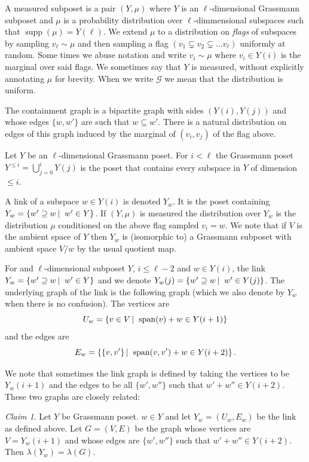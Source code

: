 \documentclass[10pt,a4paper]{article}
\theoremstyle{definition}
\theoremstyle{remark}
\newtheorem{claim}[theorem]{Claim}
\newcommand\sett[2]{\left\{ #1 \left| \; \vphantom{#1 #2} \right. #2  \right\}}
\newcommand{\set}[1]{\{#1\}}
\def\sp{\mathrm{ span}}
\DeclareMathOperator{\supp}{supp}
\renewcommand{\leq}{\leqslant}
\numberwithin{equation}{section}
\def\Gr{\mathcal{G}}
\def\Y{Y}
\begin{document}
A measured subposet is a pair \((\Y,\mu)\) where \(\Y\) is an \(\ell\)-dimensional Grassmann subposet and \(\mu\) is a probability distribution over \(\ell\)-dimmensional subspaces such that \(\supp(\mu) = \Y(\ell)\). We extend \(\mu\) to a distribution on \emph{flags} of subspaces by sampling \(v_\ell \sim \mu\) and then sampling a flag \((v_1 \subsetneq v_2 \subsetneq \dots v_\ell)\) uniformly at random. Some times we abuse notation and write \(v_i \sim \mu\) where \(v_i \in \Y(i)\) is the marginal over said flags. We sometimes say that \(\Y\) is measured, without explicitly annotating \(\mu\) for brevity. When we write \(\Gr\) we mean that the distribution is uniform.

The containment graph is a bipartite graph with sides \((\Y(i),\Y(j))\) and whose edges \(\set{w,w'}\) are such that \(w \subseteq w'\). There is a natural distribution on edges of this graph induced by the marginal of \((v_i,v_j)\) of the flag above.

Let \(\Y\) be an \(\ell\)-dimensional Grassmann poset. For \(i < \ell\) the Grassmann poset \(\Y^{\leq i} = \bigcup_{j=0}^i \Y(j)\) is the poset that contains every subspace in \(\Y\) of dimension \(\leq i\).

A link of a subspace \(w \in \Y(i)\) is denoted \(\Y_w\). It is the poset containing \(\Y_w = \sett{w' \supseteq w}{w' \in \Y}\). If \((\Y,\mu)\) is measured the distribution over \(\Y_w\) is the distribution \(\mu\) conditioned on the above flag sampled \(v_i = w\). We note that if \(V\) is the ambient space of \(\Y\) then \(\Y_w\) is (isomorphic to) a Grassmann subposet with ambient space \(V/w\) by the usual quotient map.

For and \(\ell\)-dimensional subposet \(\Y\), \(i \leq \ell-2\) and \(w \in \Y(i)\), the link \(\Y_w = \sett{w' \supseteq w}{w' \in \Y}\) and we denote \(\Y_w(j) = \sett{w' \supseteq w}{w' \in \Y(j)}\). The underlying graph of the link is the following graph (which we also denote by \(\Y_w\) when there is no confusion). The vertices are
\[U_w = \sett{v \in V}{\sp(v) + w \in \Y(i+1)}\]
and the edges are
\[E_w = \sett{\set{v,v'}}{\sp(v,v') + w \in \Y(i+2)}.\]

We note that sometimes the link graph is defined by taking the vertices to be \(\Y_w(i+1)\) and the edges to be all \(\set{w',w''}\) such that \(w'+w'' \in \Y(i+2)\). These two graphs are closely related: 
\begin{claim} \label{claim:smaller-vs-bigger-link-defs}
    Let \(\Y\) be Grassmann poset. \(w \in \Y\) and let \(\Y_w=(U_w,E_w)\) be the link as defined above. Let \(G = (V,E)\) be the graph whose vertices are \(V = \Y_w(i+1)\) and whose edges are \(\set{w',w''}\) such that \(w'+w'' \in \Y(i+2)\). Then \(\lambda(Y_w) = \lambda(G)\).
\end{claim}
\end{document}
